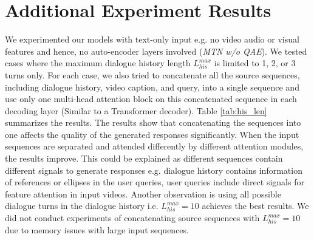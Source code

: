 \documentclass[11pt,a4paper]{article}
\begin{document}
\section{Additional Experiment Results}
\label{app:additional_results}
We experimented our models with text-only input e.g. no video audio or visual features and hence, no auto-encoder layers involved (\textit{MTN w/o QAE}). We tested cases where the maximum dialogue history length $L^{max}_{his}$ is limited to 1, 2, or 3 turns only. For each case, we also tried to concatenate all the source sequences, including dialogue history, video caption, and query, into a single sequence and use only one multi-head attention block on this concatenated sequence in each decoding layer (Similar to a Transformer decoder). Table \ref{tab:his_len} summarizes the results. The results show that concatenating the sequences into one affects the quality of the generated responses significantly. When the input sequences are separated and attended differently by different attention modules, the results improve. This could be explained as different sequences contain different signals to generate responses e.g. dialogue history contains information of references or ellipses in the user queries, user queries include direct signals for feature attention in input videos. 
Another observation is using all possible dialogue turns in the dialogue history i.e. $L^{max}_{his}=10$ achieves the best results. We did not conduct experiments of concatenating source sequences with $L^{max}_{his}=10$ due to memory issues with large input sequences. 
\end{document}

